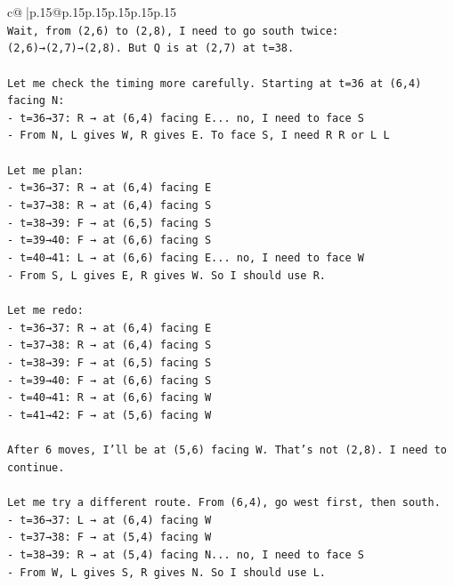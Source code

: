 \documentclass{article}
\begin{document}
{\begin{supertabular}{c@{$\;$}|p{.15\linewidth}@{}p{.15\linewidth}p{.15\linewidth}p{.15\linewidth}p{.15\linewidth}p{.15\linewidth}}
{{{\\ 
\texttt{Wait, from (2,6) to (2,8), I need to go south twice: (2,6)→(2,7)→(2,8). But Q is at (2,7) at t=38.} \\
\\ 
\texttt{Let me check the timing more carefully. Starting at t=36 at (6,4) facing N:} \\
\texttt{{-} t=36→37: R → at (6,4) facing E... no, I need to face S} \\
\texttt{{-} From N, L gives W, R gives E. To face S, I need R R or L L} \\
\\ 
\texttt{Let me plan:} \\
\texttt{{-} t=36→37: R → at (6,4) facing E} \\
\texttt{{-} t=37→38: R → at (6,4) facing S} \\
\texttt{{-} t=38→39: F → at (6,5) facing S} \\
\texttt{{-} t=39→40: F → at (6,6) facing S} \\
\texttt{{-} t=40→41: L → at (6,6) facing E... no, I need to face W} \\
\texttt{{-} From S, L gives E, R gives W. So I should use R.} \\
\\ 
\texttt{Let me redo:} \\
\texttt{{-} t=36→37: R → at (6,4) facing E} \\
\texttt{{-} t=37→38: R → at (6,4) facing S} \\
\texttt{{-} t=38→39: F → at (6,5) facing S} \\
\texttt{{-} t=39→40: F → at (6,6) facing S} \\
\texttt{{-} t=40→41: R → at (6,6) facing W} \\
\texttt{{-} t=41→42: F → at (5,6) facing W} \\
\\ 
\texttt{After 6 moves, I'll be at (5,6) facing W. That's not (2,8). I need to continue.} \\
\\ 
\texttt{Let me try a different route. From (6,4), go west first, then south.} \\
\texttt{{-} t=36→37: L → at (6,4) facing W} \\
\texttt{{-} t=37→38: F → at (5,4) facing W} \\
\texttt{{-} t=38→39: R → at (5,4) facing N... no, I need to face S} \\
\texttt{{-} From W, L gives S, R gives N. So I should use L.} \\
}}}
\end{supertabular}}
\end{document}
